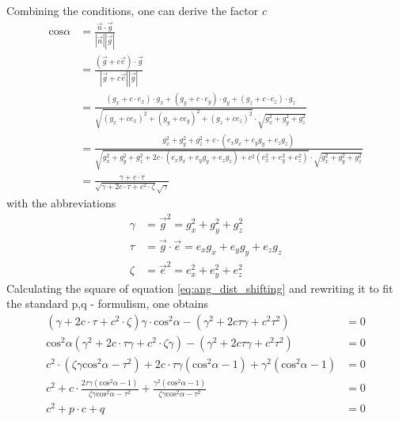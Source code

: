 Combining the conditions, one can derive the factor $c$
\begin{equation}
\label{eq:ang_dist_shifting}
 \begin{align}
 \text{cos} \alpha &= \frac{\vec{n} \cdot \vec{g}}{|\vec{n}| |\vec{g}|} \\
&= \frac{\left(\vec{g} + c \vec{e} \right) \cdot \vec{g}}{|\vec{g} + c
\vec{e}| |\vec{g}|} \\
&= \frac{\left(g_x + c \cdot e_x\right) \cdot g_x + \left(g_y + c \cdot
e_y\right) \cdot g_y + \left(g_z + c \cdot e_z\right) \cdot
g_z}{\sqrt{\left(g_x + c e_x \right)^2 + \left(g_y + c e_y \right)^2 +\left(g_z
+ c e_z \right)^2 } \cdot \sqrt{g_x^2 + g_y^2 +g_z^2}} \\
&= \frac{g_x^2 + g_y^2 +g_z^2 + c \cdot \left(e_x g_x + e_y g_y + e_z g_z
\right)}{\sqrt{g_x^2 + g_y^2 +g_z^2 + 2 c \cdot \left(e_x g_x + e_y g_y + e_z
g_z \right) + c^2 \left( e_x^2 + e_y^2 + e_z^2 \right) } \cdot \sqrt{g_x^2 +
g_y^2 +g_z^2}} \\
&= \frac{\gamma + c \cdot \tau}{\sqrt{\gamma + 2 c \cdot \tau + c^2 \cdot \zeta}
\sqrt{\gamma}}
 \end{align}
\end{equation}
with the abbreviations
\begin{equation}
 \begin{align}
  \gamma &= \vec{g}^2 = g_x^2 + g_y^2 +g_z^2 \\
  \tau &= \vec{g}\cdot \vec{e}=e_x g_x + e_y g_y + e_z g_z\\
  \zeta &=  \vec{e}^2 =e_x^2 + e_y^2 + e_z^2
 \end{align}
\end{equation}
Calculating the square of equation \ref{eq:ang_dist_shifting} and rewriting it
to fit the
standard p,q - formulism, one obtains
\begin{equation}
 \begin{align}
\left(
\gamma + 2 c \cdot \tau + c^2 \cdot \zeta \right) \gamma \cdot \text{cos}^2
\alpha - \left(\gamma^2 + 2 c \tau \gamma  + c^2 \tau^2 \right) &= 0\\
\text{cos}^2\alpha \left(\gamma^2 + 2 c \cdot \tau \gamma + c^2 \cdot \zeta
\gamma \right) - \left( \gamma^2 + 2 c \tau \gamma  + c^2 \tau^2\right) &= 0\\
c^2 \cdot \left(\zeta \gamma \text{cos}^2\alpha - \tau^2 \right) + 2 c \cdot
\tau \gamma \left( \text{cos}^2\alpha - 1 \right) + \gamma^2 \left(
\text{cos}^2\alpha - 1 \right)  &= 0 \\
c^2 + c \cdot \frac{ 2 \tau \gamma \left(\text{cos}^2\alpha - 1 \right)}{\zeta
\gamma \text{cos}^2\alpha - \tau^2} + \frac{\gamma^2 \left(
\text{cos}^2\alpha - 1 \right) }{\zeta
\gamma \text{cos}^2\alpha - \tau^2} &= 0 \\
c^2 + p \cdot c + q &= 0
 \end{align}
\end{equation}
